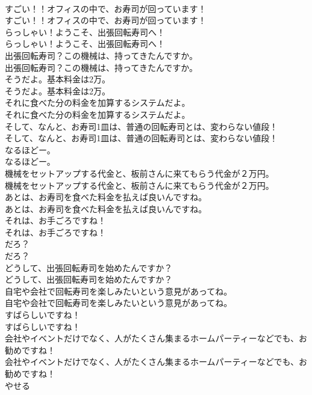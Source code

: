 \documentclass[8pt]{extreport}
\begin{document}
\begin{CJK}{UTF8}{min}
\\	すごい！！オフィスの中で、お寿司が回っています！	
\\	すごい！！オフィスの中で、お寿司が回っています！ 
\\	らっしゃい！ようこそ、出張回転寿司へ！	
\\	らっしゃい！ようこそ、出張回転寿司へ！ 
\\	出張回転寿司？この機械は、持ってきたんですか。	
\\	出張回転寿司？この機械は、持ってきたんですか。 
\\	そうだよ。基本料金は2万。	
\\	そうだよ。基本料金は2万。 
\\	それに食べた分の料金を加算するシステムだよ。	
\\	それに食べた分の料金を加算するシステムだよ。 
\\	そして、なんと、お寿司1皿は、普通の回転寿司とは、変わらない値段！	
\\	そして、なんと、お寿司1皿は、普通の回転寿司とは、変わらない値段！ 
\\	なるほどー。	
\\	なるほどー。 
\\	機械をセットアップする代金と、板前さんに来てもらう代金が２万円。	
\\	機械をセットアップする代金と、板前さんに来てもらう代金が２万円。 
\\	あとは、お寿司を食べた料金を払えば良いんですね。	
\\	あとは、お寿司を食べた料金を払えば良いんですね。 
\\	それは、お手ごろですね！	
\\	それは、お手ごろですね！ 
\\	だろ？	
\\	だろ？ 
\\	どうして、出張回転寿司を始めたんですか？	
\\	どうして、出張回転寿司を始めたんですか？ 
\\	自宅や会社で回転寿司を楽しみたいという意見があってね。	
\\	自宅や会社で回転寿司を楽しみたいという意見があってね。 
\\	すばらしいですね！	
\\	すばらしいですね！ 
\\	会社やイベントだけでなく、人がたくさん集まるホームパーティーなどでも、お勧めですね！	
\\	会社やイベントだけでなく、人がたくさん集まるホームパーティーなどでも、お勧めですね！ 
\\	やせる

\end{CJK}
\end{document}
